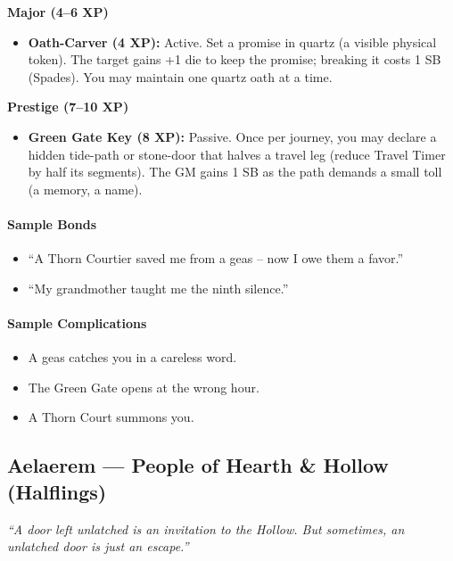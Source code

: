 \textbf{Major (4--6 XP)}
\begin{itemize}
  \item \textbf{Oath-Carver (4 XP):} Active. Set a promise in quartz (a visible physical token). The target gains +1 die to keep the promise; breaking it costs 1 SB (Spades). You may maintain one quartz oath at a time.
\end{itemize}

\textbf{Prestige (7--10 XP)}
\begin{itemize}
  \item \textbf{Green Gate Key (8 XP):} Passive. Once per journey, you may declare a hidden tide-path or stone-door that halves a travel leg (reduce Travel Timer by half its segments). The GM gains 1 SB as the path demands a small toll (a memory, a name).
\end{itemize}

\paragraph{Sample Bonds}
\begin{itemize}
  \item ``A Thorn Courtier saved me from a geas -- now I owe them a favor.''
  \item ``My grandmother taught me the ninth silence.''
\end{itemize}

\paragraph{Sample Complications}
\begin{itemize}
  \item A geas catches you in a careless word.
  \item The Green Gate opens at the wrong hour.
  \item A Thorn Court summons you.
\end{itemize}

\clearpage

\subsection{Aelaerem --- People of Hearth \& Hollow (Halflings)}
\label{sec:aelaerem-detailed}

\emph{``A door left unlatched is an invitation to the Hollow. But sometimes, an unlatched door is just an escape.''}

